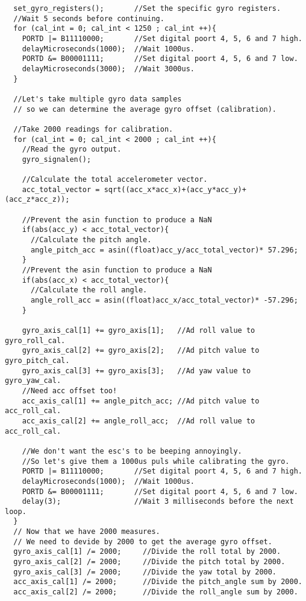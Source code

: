 \begin{lstlisting}
  set_gyro_registers();       //Set the specific gyro registers.
  //Wait 5 seconds before continuing.
  for (cal_int = 0; cal_int < 1250 ; cal_int ++){                           
    PORTD |= B11110000;       //Set digital poort 4, 5, 6 and 7 high.
    delayMicroseconds(1000);  //Wait 1000us.
    PORTD &= B00001111;       //Set digital poort 4, 5, 6 and 7 low.
    delayMicroseconds(3000);  //Wait 3000us.
  }

  //Let's take multiple gyro data samples
  // so we can determine the average gyro offset (calibration).

  //Take 2000 readings for calibration.
  for (cal_int = 0; cal_int < 2000 ; cal_int ++){
    //Read the gyro output.                          
    gyro_signalen();                                                        

    //Calculate the total accelerometer vector.
    acc_total_vector = sqrt((acc_x*acc_x)+(acc_y*acc_y)+(acc_z*acc_z));     

    //Prevent the asin function to produce a NaN
    if(abs(acc_y) < acc_total_vector){   
      //Calculate the pitch angle.                                   
      angle_pitch_acc = asin((float)acc_y/acc_total_vector)* 57.296;        
    }
    //Prevent the asin function to produce a NaN
    if(abs(acc_x) < acc_total_vector){
      //Calculate the roll angle.                                      
      angle_roll_acc = asin((float)acc_x/acc_total_vector)* -57.296;        
    }
    
    gyro_axis_cal[1] += gyro_axis[1];   //Ad roll value to gyro_roll_cal.
    gyro_axis_cal[2] += gyro_axis[2];   //Ad pitch value to gyro_pitch_cal.
    gyro_axis_cal[3] += gyro_axis[3];   //Ad yaw value to gyro_yaw_cal.
    //Need acc offset too!  
    acc_axis_cal[1] += angle_pitch_acc; //Ad pitch value to acc_roll_cal.
    acc_axis_cal[2] += angle_roll_acc;  //Ad roll value to acc_roll_cal.
    
    //We don't want the esc's to be beeping annoyingly. 
    //So let's give them a 1000us puls while calibrating the gyro.
    PORTD |= B11110000;       //Set digital poort 4, 5, 6 and 7 high.
    delayMicroseconds(1000);  //Wait 1000us.
    PORTD &= B00001111;       //Set digital poort 4, 5, 6 and 7 low.
    delay(3);                 //Wait 3 milliseconds before the next loop.
  }
  // Now that we have 2000 measures.
  // We need to devide by 2000 to get the average gyro offset.
  gyro_axis_cal[1] /= 2000;     //Divide the roll total by 2000.
  gyro_axis_cal[2] /= 2000;     //Divide the pitch total by 2000.
  gyro_axis_cal[3] /= 2000;     //Divide the yaw total by 2000.
  acc_axis_cal[1] /= 2000;      //Divide the pitch_angle sum by 2000.
  acc_axis_cal[2] /= 2000;      //Divide the roll_angle sum by 2000.


\end{lstlisting}
